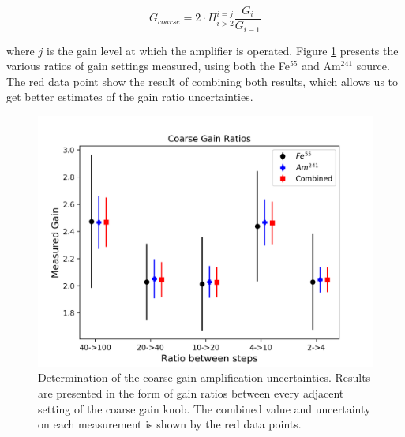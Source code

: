 \begin{equation}
  \label{eq:gain_abs}
  G_{coarse} = 2\cdot\Pi_{i>2}^{i=j}\frac{G_{i}}{G_{i-1}}
\end{equation}

where $j$ is the gain level at which the amplifier is operated. Figure \ref{fig:coarse_gain} presents the various ratios of gain settings measured, using both the Fe$^{55}$ and Am$^{241}$ source. The red data point show the result of combining both results, which allows us to get better estimates of the gain ratio uncertainties.

\begin{figure}[ht]
  \includegraphics[width=\textwidth]{graphics/coarse_gain_calibration.png}
  \caption{Determination of the coarse gain amplification uncertainties. Results are presented in the form of gain ratios between every adjacent setting of the coarse gain knob. The combined value and uncertainty on each measurement is shown by the red data points.}
  \label{fig:coarse_gain}
\end{figure}


